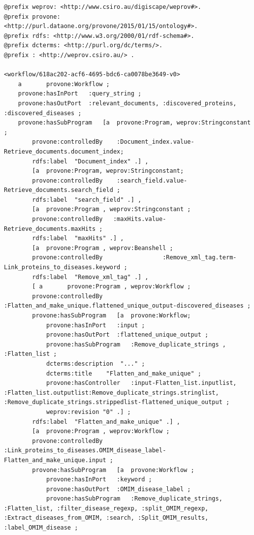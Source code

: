 \documentclass[ao]{iosart2x}
\begin{document}
\begin{lstlisting}[frame=single, caption={BioAIDDiseaseDiscovery workflow  specification provenance},label={lst:specs}]
@prefix weprov: <http://www.csiro.au/digiscape/weprov#>.
@prefix provone: <http://purl.dataone.org/provone/2015/01/15/ontology#>.
@prefix rdfs: <http://www.w3.org/2000/01/rdf-schema#>.
@prefix dcterms: <http://purl.org/dc/terms/>.
@prefix : <http://weprov.csiro.au/> .

<workflow/618ac202-acf6-4695-bdc6-ca0078be3649-v0>
    a       provone:Workflow ;
    provone:hasInPort   :query_string ;
    provone:hasOutPort	:relevant_documents, :discovered_proteins, :discovered_diseases ;
    provone:hasSubProgram   [a  provone:Program, weprov:Stringconstant ;
        provone:controlledBy    :Document_index.value-Retrieve_documents.document_index;
        rdfs:label	"Document_index" .] , 
        [a  provone:Program, weprov:Stringconstant;
        provone:controlledBy    :search_field.value-Retrieve_documents.search_field ;
        rdfs:label  "search_field" .] , 
        [a  provone:Program , weprov:Stringconstant ;
        provone:controlledBy   :maxHits.value-Retrieve_documents.maxHits ;
        rdfs:label  "maxHits" .] , 
        [a  provone:Program , weprov:Beanshell ;
        provone:controlledBy                 :Remove_xml_tag.term-Link_proteins_to_diseases.keyword ;
        rdfs:label  "Remove_xml_tag" .] , 
        [ a       provone:Program , weprov:Workflow ;
        provone:controlledBy    :Flatten_and_make_unique.flattened_unique_output-discovered_diseases ;
        provone:hasSubProgram   [a  provone:Workflow;
            provone:hasInPort   :input ;
            provone:hasOutPort  :flattened_unique_output ;
            provone:hasSubProgram   :Remove_duplicate_strings , :Flatten_list ;
            dcterms:description  "..." ;
            dcterms:title    "Flatten_and_make_unique" ;
            provone:hasController   :input-Flatten_list.inputlist, :Flatten_list.outputlist:Remove_duplicate_strings.stringlist, :Remove_duplicate_strings.strippedlist-flattened_unique_output ;
            weprov:revision "0" .] ;
        rdfs:label  "Flatten_and_make_unique" .] , 
        [a  provone:Program , weprov:Workflow ;
        provone:controlledBy    :Link_proteins_to_diseases.OMIM_disease_label-Flatten_and_make_unique.input ;
        provone:hasSubProgram   [a  provone:Workflow ;
            provone:hasInPort   :keyword ;
            provone:hasOutPort  :OMIM_disease_label ;
            provone:hasSubProgram   :Remove_duplicate_strings, :Flatten_list, :filter_disease_regexp, :split_OMIM_regexp, :Extract_diseases_from_OMIM, :search, :Split_OMIM_results, :label_OMIM_disease ;

\end{lstlisting}
\end{document}
